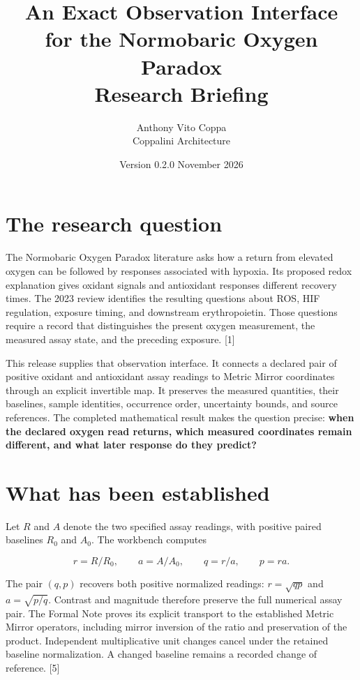 \documentclass[11pt]{article}
\title{\Large\bfseries An Exact Observation Interface\\for the Normobaric Oxygen Paradox\\[6pt]\normalsize\mdseries Research Briefing}
\author{Anthony Vito Coppa\\\small Coppalini Architecture}
\date{Version 0.2.0 \quad 12 November 2026}
\begin{document}
\maketitle
\vspace{-1em}
\section*{The research question}\label{the-research-question}

The Normobaric Oxygen Paradox literature asks how a return from elevated
oxygen can be followed by responses associated with hypoxia. Its
proposed redox explanation gives oxidant signals and antioxidant
responses different recovery times. The 2023 review identifies the
resulting questions about ROS, HIF regulation, exposure timing, and
downstream erythropoietin. Those questions require a record that
distinguishes the present oxygen measurement, the measured assay state,
and the preceding exposure. {[}1{]}

This release supplies that observation interface. It connects a declared
pair of positive oxidant and antioxidant assay readings to Metric Mirror
coordinates through an explicit invertible map. It preserves the
measured quantities, their baselines, sample identities, occurrence
order, uncertainty bounds, and source references. The completed
mathematical result makes the question precise: \textbf{when the
declared oxygen read returns, which measured coordinates remain
different, and what later response do they predict?}

\section*{What has been established}\label{what-has-been-established}

Let \(R\) and \(A\) denote the two specified assay readings, with
positive paired baselines \(R_0\) and \(A_0\). The workbench computes

\[
r=R/R_0,\qquad a=A/A_0,\qquad q=r/a,\qquad p=ra.
\]

The pair \((q,p)\) recovers both positive normalized readings:
\(r=\sqrt{qp}\) and \(a=\sqrt{p/q}\). Contrast and magnitude therefore
preserve the full numerical assay pair. The Formal Note proves its
explicit transport to the established Metric Mirror operators, including
mirror inversion of the ratio and preservation of the product.
Independent multiplicative unit changes cancel under the retained
baseline normalization. A changed baseline remains a recorded change of
reference. {[}5{]}
\end{document}
